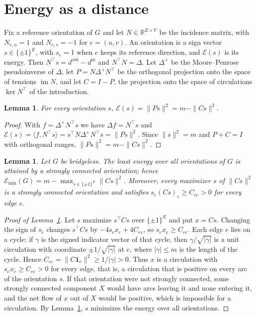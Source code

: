 \documentclass[11pt]{amsart}
\newtheorem{lem}[thm]{Lemma}
\theoremstyle{definition}
\theoremstyle{remark}
\numberwithin{equation}{section}
\newcommand{\Emin}{\mathcal E_{\min}}
\newcommand{\R}{\mathbb R}
\begin{document}
\section{Energy as a distance}\label{sec:prelim}

Fix a reference orientation of $G$ and let $N\in\R^{E\times V}$ be the incidence matrix, with $N_{e,u}=1$ and $N_{e,v}=-1$ for $e=(u,v)$. An orientation is a sign vector $s\in\{\pm1\}^E$, with $s_e=1$ when $e$ keeps its reference direction, and $\mathcal E(s)$ is its energy. Then $N^{\top}s=d^{\mathrm{out}}-d^{\mathrm{in}}$ and $N^{\top}N=\Delta$. Let $\Delta^{+}$ be the Moore--Penrose pseudoinverse of $\Delta$, let $P=N\Delta^{+}N^{\top}$ be the orthogonal projection onto the space of tensions $\operatorname{im}N$, and let $C=I-P$, the projection onto the space of circulations $\ker N^{\top}$ of the introduction.

\begin{lem}\label{lem:energy}
For every orientation $s$, $\mathcal E(s)=\|Ps\|^2=m-\|Cs\|^2$.
\end{lem}

\begin{proof}
With $f=\Delta^{+}N^{\top}s$ we have $\Delta f=N^{\top}s$ and $\mathcal E(s)=\langle f,N^{\top}s\rangle=s^{\top}N\Delta^{+}N^{\top}s=\|Ps\|^2$. Since $\|s\|^2=m$ and $P+C=I$ with orthogonal ranges, $\|Ps\|^2=m-\|Cs\|^2$.
\end{proof}

\begin{lem}\label{lem:strong}
Let $G$ be bridgeless. The least energy over all orientations of $G$ is attained by a strongly connected orientation; hence $\Emin(G)=m-\max_{s\in\{\pm1\}^E}\|Cs\|^2$. Moreover, every maximizer $s$ of $\|Cs\|^2$ is a strongly connected orientation and satisfies $s_e(Cs)_e\ge C_{ee}>0$ for every edge $e$.
\end{lem}

\begin{proof}[Proof of Lemma~\ref{lem:strong}]
Let $s$ maximize $s^{\top}Cs$ over $\{\pm1\}^E$ and put $x=Cs$. Changing the sign of $s_e$ changes $s^{\top}Cs$ by $-4s_ex_e+4C_{ee}$, so $s_ex_e\ge C_{ee}$. Each edge $e$ lies on a cycle; if $\gamma$ is the signed indicator vector of that cycle, then $\gamma/\sqrt{|\gamma|}$ is a unit circulation with coordinate $\pm1/\sqrt{|\gamma|}$ at $e$, where $|\gamma|\le m$ is the length of the cycle. Hence $C_{ee}=\|C\mathbf 1_e\|^2\ge1/|\gamma|>0$. Thus $x$ is a circulation with $s_ex_e\ge C_{ee}>0$ for every edge, that is, a circulation that is positive on every arc of the orientation $s$. If that orientation were not strongly connected, some strongly connected component $X$ would have arcs leaving it and none entering it, and the net flow of $x$ out of $X$ would be positive, which is impossible for a circulation. By Lemma~\ref{lem:energy}, $s$ minimizes the energy over all orientations.
\end{proof}
\end{document}
